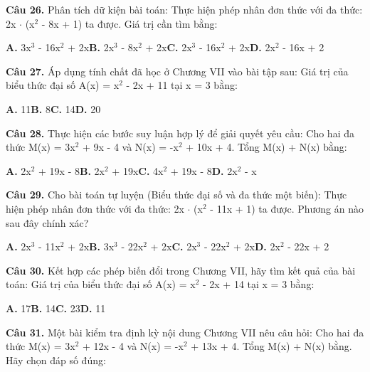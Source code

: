 \documentclass[11pt,a4paper]{article}
\begin{document}
\textbf{\color{primary} Câu 26.} Phân tích dữ kiện bài toán: Thực hiện phép nhân đơn thức với đa thức: 2x $\cdot$ (x$^2$ - 8x + 1) ta được. Giá trị cần tìm bằng:\par
\hspace*{1.5em}\textbf{A.} 3x$^3$ - 16x$^2$ + 2x\quad\quad \textbf{B.} 2x$^3$ - 8x$^2$ + 2x\quad\quad \textbf{C.} 2x$^3$ - 16x$^2$ + 2x\quad\quad \textbf{D.} 2x$^2$ - 16x + 2\par\vspace{2pt}
\textbf{\color{primary} Câu 27.} Áp dụng tính chất đã học ở Chương VII vào bài tập sau: Giá trị của biểu thức đại số A(x) = x$^2$ - 2x + 11 tại x = 3 bằng:\par
\hspace*{1.5em}\textbf{A.} 11\quad\quad \textbf{B.} 8\quad\quad \textbf{C.} 14\quad\quad \textbf{D.} 20\par\vspace{2pt}
\textbf{\color{primary} Câu 28.} Thực hiện các bước suy luận hợp lý để giải quyết yêu cầu: Cho hai đa thức M(x) = 3x$^2$ + 9x - 4 và N(x) = -x$^2$ + 10x + 4. Tổng M(x) + N(x) bằng:\par
\hspace*{1.5em}\textbf{A.} 2x$^2$ + 19x - 8\quad\quad \textbf{B.} 2x$^2$ + 19x\quad\quad \textbf{C.} 4x$^2$ + 19x - 8\quad\quad \textbf{D.} 2x$^2$ - x\par\vspace{2pt}
\textbf{\color{primary} Câu 29.} Cho bài toán tự luyện (Biểu thức đại số và đa thức một biến): Thực hiện phép nhân đơn thức với đa thức: 2x $\cdot$ (x$^2$ - 11x + 1) ta được. Phương án nào sau đây chính xác?\par
\hspace*{1.5em}\textbf{A.} 2x$^3$ - 11x$^2$ + 2x\quad\quad \textbf{B.} 3x$^3$ - 22x$^2$ + 2x\quad\quad \textbf{C.} 2x$^3$ - 22x$^2$ + 2x\quad\quad \textbf{D.} 2x$^2$ - 22x + 2\par\vspace{2pt}
\textbf{\color{primary} Câu 30.} Kết hợp các phép biến đổi trong Chương VII, hãy tìm kết quả của bài toán: Giá trị của biểu thức đại số A(x) = x$^2$ - 2x + 14 tại x = 3 bằng:\par
\hspace*{1.5em}\textbf{A.} 17\quad\quad \textbf{B.} 14\quad\quad \textbf{C.} 23\quad\quad \textbf{D.} 11\par\vspace{2pt}
\textbf{\color{primary} Câu 31.} Một bài kiểm tra định kỳ nội dung Chương VII nêu câu hỏi: Cho hai đa thức M(x) = 3x$^2$ + 12x - 4 và N(x) = -x$^2$ + 13x + 4. Tổng M(x) + N(x) bằng. Hãy chọn đáp số đúng:\par
\end{document}
